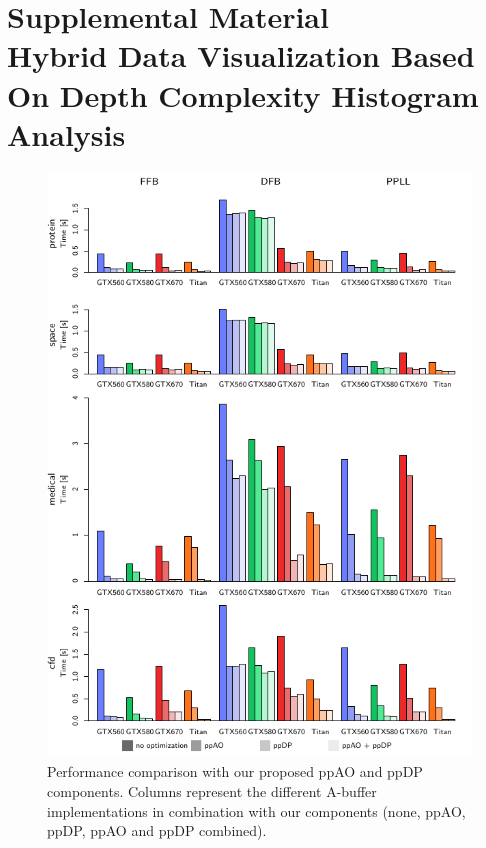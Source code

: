 \documentclass[a4,12pt]{scrartcl}
\newcommand{\ab}{\mbox{A-buffer}}
\newcommand{\stencil}{ppAO}
\newcommand{\dloop}{ppDP}
\begin{document}
\thispagestyle{empty}

\section*{{\smaller Supplemental Material}\\ Hybrid Data Visualization Based On Depth Complexity Histogram Analysis}
\label{sec:suppl}

\begin{figure}[h!]
  \centering
  \includegraphics[scale=1.5]{suppl-plot-performance}
  \caption{\label{fig:perfsuppl}%
    Performance comparison with our proposed \stencil{} and \dloop{} components.
    Columns represent the different \ab{} implementations in combination with our components (none, \stencil{}, \dloop{}, \stencil{} and \dloop{} combined).
  }
\end{figure}
\end{document}
